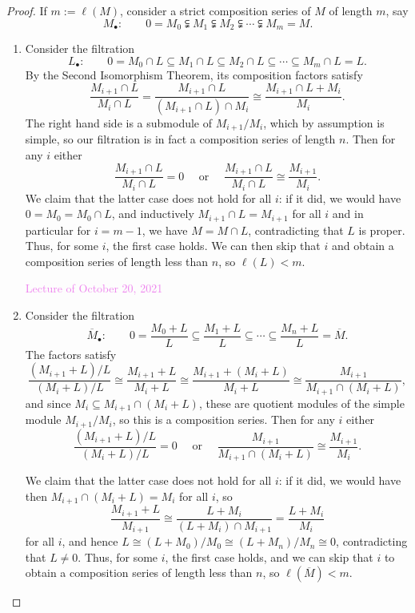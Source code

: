 \documentclass{amsart}[12pt]
\newcommand{\Oct}[1]{\textcolor{violet}{Lecture of October #1, 2021}}
\numberwithin{equation}{section}
\theoremstyle{plain} %
\theoremstyle{definition}
\theoremstyle{remark}
\begin{document}
\begin{proof}
If $m := \ell(M)$, consider a strict composition series of $M$ of length $m$, say
	\[M_\bullet: \qquad  0 = M_0 \subsetneqq M_1 \subsetneqq M_2 \subsetneqq \cdots \subsetneqq M_m = M.\]
	
\begin{enumerate}
	\item Consider the filtration
	$$L_\bullet: \qquad  0 = M_0 \cap L \subseteq M_1 \cap L \subseteq M_2 \cap L \subseteq \cdots \subseteq M_m \cap L = L.$$
	By the Second Isomorphism Theorem, its composition factors satisfy
	$$\frac{M_{i+1} \cap L}{M_i \cap L} = \frac{M_{i+1} \cap L}{(M_{i+1} \cap L) \cap M_i} \cong \frac{M_{i+1} \cap L + M_i} {M_i}.$$
	The right hand side is a submodule of $M_{i+1}/M_i$, which by assumption is simple, so our filtration is in fact a composition series of length $n$. Then for any $i$ either 
	$$\frac{M_{i+1} \cap L}{M_i \cap L} = 0 \quad \textrm{ or } \quad \frac{M_{i+1} \cap L}{M_i \cap L}\cong \frac{M_{i+1}}{M_i}.$$
	We claim that the latter case does not hold for all $i$: if it did, we would have $0=M_0 = M_0 \cap L$, and inductively $M_{i+1} \cap L = M_{i+1}$ for all $i$ and in particular for $i=m-1$, we have $M = M\cap L$, contradicting that $L$ is proper. Thus, for some $i$, the first case holds. We can then skip that $i$ and obtain a composition series of length less than $n$, so $\ell(L)<m$.	
	

	\Oct{20}
	
	\item Consider the filtration
	\[ \overline{M}_\bullet: \qquad 0 = \frac{M_0 + L }{L} \subseteq \frac{M_1 + L }{L} \subseteq \cdots \subseteq \frac{M_n + L }{L} = \overline{M}.\]
	The factors satisfy
	\[ \frac{(M_{i+1} + L )/ L }{(M_i + L) / L} \cong \frac{M_{i+1} + L}{M_{i} + L} \cong \frac{M_{i+1} + (M_i+L)}{M_i+L}\cong \frac{M_{i+1} }{M_{i+1} \cap( M_i + L)},\] and since $M_i \subseteq M_{i+1} \cap (M_i+L)$, these are quotient modules of the simple module $M_{i+1}/M_i$, so this is a composition series. Then for any $i$ either 
	$$\frac{(M_{i+1} + L )/ L }{(M_i + L) / L}  = 0 \quad \textrm{ or } \quad \frac{M_{i+1} }{M_{i+1} \cap( M_i + L)}  \cong  \frac{M_{i+1}}{M_i}.$$

	We claim that the latter case does not hold for all $i$: if it did, we would have then $M_{i+1} \cap (M_i+L) = M_{i}$ for all $i$, so \[ \frac{M_{i+1} + L}{M_{i+1}} \cong \frac{L+M_i}{(L+M_i) \cap M_{i+1}} =\frac{L+M_i}{M_i}\]
	for all $i$, and hence $L \cong (L+M_0)/M_0 \cong (L+M_n)/M_n \cong 0$, contradicting that $L\neq 0$. Thus, for some $i$, the first case holds, and we can skip that $i$ to obtain a composition series of length less than $n$, so $\ell(\overline{M})<m$.
	

\end{enumerate}
\end{proof}
\end{document}
